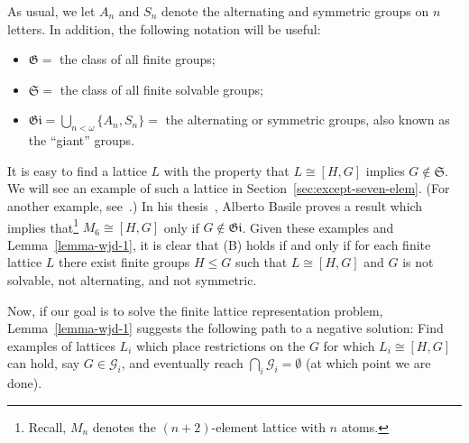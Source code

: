 \documentclass[cm,dissertation]{uhthesis}
\theoremstyle{plain}
\theoremstyle{definition}
\theoremstyle{remark}
\numberwithin{theorem}{section}
\numberwithin{claim}{chapter}
\numberwithin{equation}{section}
\numberwithin{conjecture}{chapter}
\newcommand{\<}{\ensuremath{\langle}}
\renewcommand{\>}{\ensuremath{\rangle}}
\renewcommand{\leq}{\ensuremath{\leqslant}}
\newcommand{\0}{\ensuremath{\mathbf{0}}}
\newcommand{\1}{\ensuremath{\mathbf{1}}}
\newcommand{\2}{\ensuremath{\mathbf{2}}}
\newcommand{\3}{\ensuremath{\mathbf{3}}}
\newcommand{\4}{\ensuremath{\mathbf{4}}}
\newcommand{\5}{\ensuremath{\mathbf{5}}}
\newcommand{\sG}{\ensuremath{\mathscr{G}}}
\newcommand{\G}{\ensuremath{\mathfrak{G}}}
\newcommand{\giant}{\ensuremath{\mathfrak{Gi}}}
\newcommand{\solvable}{\ensuremath{\mathfrak{S}}}
\begin{document}
As usual, we let $A_n$ and $S_n$ denote the alternating and symmetric groups on
$n$ letters.  In addition, the following notation will be useful:
\begin{itemize}
\item $\G = $ the class of all finite groups;
\item $\solvable = $ the class of all finite solvable groups;
\item $\giant = \bigcup\limits_{n<\omega} \{A_n, S_n\} = $ the alternating or symmetric groups, 
also known as the ``giant'' groups.
\end{itemize}

It is easy to find a lattice $L$ with the property that
$L \cong [H, G]$ implies $G\notin \solvable$.
We will see an example of such a lattice in
Section~\ref{sec:except-seven-elem}.  (For another example, see~\cite{Palfy:1995}.)
%
In his thesis~\cite{Basile:2001}, Alberto Basile proves a result 
which implies that\footnote{Recall, $M_n$ denotes the $(n+2)$-element lattice with $n$ atoms.}%
$M_6 \cong [H, G]$ only if 
$G\notin \giant$. 
Given these examples and Lemma~\ref{lemma-wjd-1}, it is clear that
(B) holds if and only if for each finite lattice $L$ there 
exist finite groups $H \leq G$ such that $L\cong [H,G]$ and $G$ 
is not solvable, not alternating, and not symmetric.

Now, if our goal is to solve the finite lattice
representation problem, Lemma~\ref{lemma-wjd-1} suggests the following path to a
negative solution:
Find examples of lattices $L_i$ which place restrictions on the $G$ for which $L_i
\cong [H,G]$ can hold, say $G\in \sG_i$, and eventually reach $\bigcap_i
\sG_i = \emptyset$ (at which point we are done).  
\end{document}
